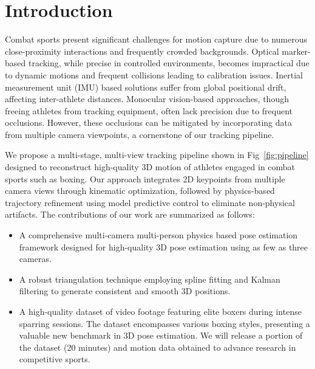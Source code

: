 \documentclass{egpubl}
\begin{document}
\section{Introduction}
Combat sports present significant challenges for motion capture due to numerous close-proximity interactions and frequently crowded backgrounds. Optical marker-based tracking, while precise in controlled environments, becomes impractical due to dynamic motions and frequent collisions leading to calibration issues. Inertial measurement unit (IMU) based solutions suffer from global positional drift, affecting inter-athlete distances. Monocular vision-based approaches, though freeing athletes from tracking equipment, often lack precision due to frequent occlusions. However, these occlusions can be mitigated by incorporating data from multiple camera viewpoints, a cornerstone of our tracking pipeline.

We propose a multi-stage, multi-view tracking pipeline shown in Fig~\ref{fig:pipeline} designed to reconstruct high-quality 3D motion of athletes engaged in combat sports such as boxing. Our approach integrates 2D keypoints from multiple camera views through kinematic optimization, followed by physics-based trajectory refinement using model predictive control to eliminate non-physical artifacts. 
The contributions of our work are summarized as follows:
\begin{itemize}
    \item A comprehensive multi-camera multi-person physics based pose estimation framework designed for high-quality 3D pose estimation using as few as three cameras.
    \item A robust triangulation technique employing spline fitting and Kalman filtering to generate consistent and smooth 3D positions.
    \item A high-quality dataset of video footage featuring elite boxers during intense sparring sessions. The dataset encompasses various boxing styles, presenting a valuable new benchmark in 3D pose estimation. We will release a portion of the dataset (20 minutes) and motion data obtained to advance research in competitive sports.
\end{itemize}



\label{sec:results} 
\end{document}
